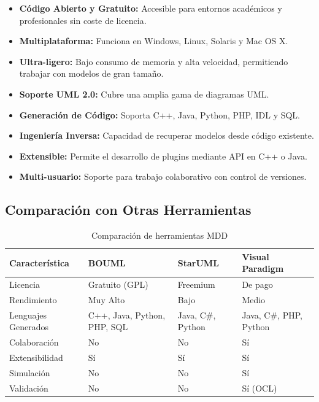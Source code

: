 \documentclass[12pt,a4paper]{article}
\begin{document}
\begin{itemize}
    \item \textbf{Código Abierto y Gratuito:} Accesible para entornos académicos y profesionales sin coste de licencia.
    \item \textbf{Multiplataforma:} Funciona en Windows, Linux, Solaris y Mac OS X.
    \item \textbf{Ultra-ligero:} Bajo consumo de memoria y alta velocidad, permitiendo trabajar con modelos de gran tamaño.
    \item \textbf{Soporte UML 2.0:} Cubre una amplia gama de diagramas UML.
    \item \textbf{Generación de Código:} Soporta C++, Java, Python, PHP, IDL y SQL.
    \item \textbf{Ingeniería Inversa:} Capacidad de recuperar modelos desde código existente.
    \item \textbf{Extensible:} Permite el desarrollo de plugins mediante API en C++ o Java.
    \item \textbf{Multi-usuario:} Soporte para trabajo colaborativo con control de versiones.
\end{itemize}

\subsection{Comparación con Otras Herramientas}

\begin{table}[H]
    \centering
    \caption{Comparación de herramientas MDD}
    \label{tab:comparacion}
    \begin{tabular}{|p{2.5cm}|p{2.5cm}|p{2.5cm}|p{2.5cm}|}
        \hline
        \textbf{Característica} & \textbf{BOUML} & \textbf{StarUML} & \textbf{Visual Paradigm} \\
        \hline
        Licencia & Gratuito (GPL) & Freemium & De pago \\
        Rendimiento & Muy Alto & Bajo & Medio \\
        Lenguajes Generados & C++, Java, Python, PHP, SQL & Java, C\#, Python & Java, C\#, PHP, Python \\
        Colaboración & No & No & Sí \\
        Extensibilidad & Sí & Sí & Sí \\
        Simulación & No & No & Sí \\
        Validación & No & No & Sí (OCL) \\
        \hline
    \end{tabular}
\end{table}
\end{document}

